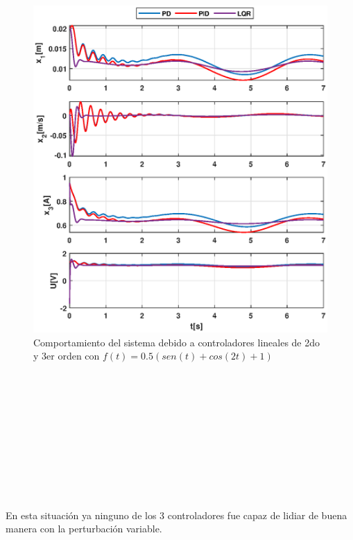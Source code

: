 \documentclass[onecolumn,10pt]{article}
\begin{document}
\begin{figure}[!h]
\centering
\includegraphics[scale=0.55]{xu_3o_pdpidlqr_pv.eps}
\caption{Comportamiento del sistema debido a controladores lineales de 2do y 3er orden con $f(t)=0.5(sen(t)+cos(2t)+1)$}
\end{figure}
\\
\\
\\
\\
\\
\\
\\
\\
\\
\\

En esta situaci\'on ya ninguno de los 3 controladores fue capaz de lidiar de buena manera con la perturbaci\'on variable.
\end{document}
